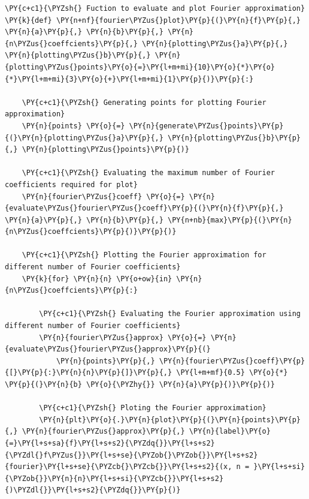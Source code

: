     \begin{tcolorbox}[breakable, size=fbox, boxrule=1pt, pad at break*=1mm,colback=cellbackground, colframe=cellborder]
\begin{Verbatim}[commandchars=\\\{\}]
\PY{c+c1}{\PYZsh{} Fuction to evaluate and plot Fourier approximation}
\PY{k}{def} \PY{n+nf}{fourier\PYZus{}plot}\PY{p}{(}\PY{n}{f}\PY{p}{,} \PY{n}{a}\PY{p}{,} \PY{n}{b}\PY{p}{,} \PY{n}{n\PYZus{}coeffcients}\PY{p}{,} \PY{n}{plotting\PYZus{}a}\PY{p}{,} \PY{n}{plotting\PYZus{}b}\PY{p}{,} \PY{n}{plotting\PYZus{}points}\PY{o}{=}\PY{l+m+mi}{10}\PY{o}{*}\PY{o}{*}\PY{l+m+mi}{3}\PY{o}{+}\PY{l+m+mi}{1}\PY{p}{)}\PY{p}{:}

    \PY{c+c1}{\PYZsh{} Generating points for plotting Fourier approximation}
    \PY{n}{points} \PY{o}{=} \PY{n}{generate\PYZus{}points}\PY{p}{(}\PY{n}{plotting\PYZus{}a}\PY{p}{,} \PY{n}{plotting\PYZus{}b}\PY{p}{,} \PY{n}{plotting\PYZus{}points}\PY{p}{)}

    \PY{c+c1}{\PYZsh{} Evaluating the maximum number of Fourier coefficients required for plot}
    \PY{n}{fourier\PYZus{}coeff} \PY{o}{=} \PY{n}{evaluate\PYZus{}fourier\PYZus{}coeff}\PY{p}{(}\PY{n}{f}\PY{p}{,} \PY{n}{a}\PY{p}{,} \PY{n}{b}\PY{p}{,} \PY{n+nb}{max}\PY{p}{(}\PY{n}{n\PYZus{}coeffcients}\PY{p}{)}\PY{p}{)}

    \PY{c+c1}{\PYZsh{} Plotting the Fourier approximation for different number of Fourier coefficients}
    \PY{k}{for} \PY{n}{n} \PY{o+ow}{in} \PY{n}{n\PYZus{}coeffcients}\PY{p}{:}

        \PY{c+c1}{\PYZsh{} Evaluating the Fourier approximation using different number of Fourier coefficients}
        \PY{n}{fourier\PYZus{}approx} \PY{o}{=} \PY{n}{evaluate\PYZus{}fourier\PYZus{}approx}\PY{p}{(}
            \PY{n}{points}\PY{p}{,} \PY{n}{fourier\PYZus{}coeff}\PY{p}{[}\PY{p}{:}\PY{n}{n}\PY{p}{]}\PY{p}{,} \PY{l+m+mf}{0.5} \PY{o}{*} \PY{p}{(}\PY{n}{b} \PY{o}{\PYZhy{}} \PY{n}{a}\PY{p}{)}\PY{p}{)}

        \PY{c+c1}{\PYZsh{} Ploting the Fourier approximation}
        \PY{n}{plt}\PY{o}{.}\PY{n}{plot}\PY{p}{(}\PY{n}{points}\PY{p}{,} \PY{n}{fourier\PYZus{}approx}\PY{p}{,} \PY{n}{label}\PY{o}{=}\PY{l+s+sa}{f}\PY{l+s+s2}{\PYZdq{}}\PY{l+s+s2}{\PYZdl{}f\PYZus{}}\PY{l+s+se}{\PYZob{}\PYZob{}}\PY{l+s+s2}{fourier}\PY{l+s+se}{\PYZcb{}\PYZcb{}}\PY{l+s+s2}{(x, n = }\PY{l+s+si}{\PYZob{}}\PY{n}{n}\PY{l+s+si}{\PYZcb{}}\PY{l+s+s2}{)\PYZdl{}}\PY{l+s+s2}{\PYZdq{}}\PY{p}{)}


\end{Verbatim}
\end{tcolorbox}
